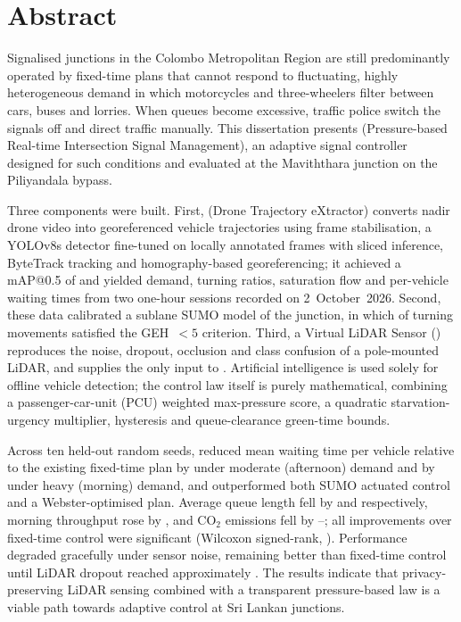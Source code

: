 \chapter*{Abstract}
\thispagestyle{plain}

Signalised junctions in the Colombo Metropolitan Region are still predominantly operated by fixed-time plans that cannot respond to fluctuating, highly heterogeneous demand in which motorcycles and three-wheelers filter between cars, buses and lorries. When queues become excessive, traffic police switch the signals off and direct traffic manually. This dissertation presents \prism{} (Pressure-based Real-time Intersection Signal Management), an adaptive signal controller designed for such conditions and evaluated at the Maviththara junction on the Piliyandala bypass.

Three components were built. First, \dtx{} (Drone Trajectory eXtractor) converts nadir drone video into georeferenced vehicle trajectories using frame stabilisation, a YOLOv8s detector fine-tuned on locally annotated frames with sliced inference, ByteTrack tracking and homography-based georeferencing; it achieved a mAP@0.5 of  and yielded demand, turning ratios, saturation flow and per-vehicle waiting times from two one-hour sessions recorded on 2~October~2026. Second, these data calibrated a sublane SUMO model of the junction, in which  of turning movements satisfied the GEH~$<5$ criterion. Third, a Virtual LiDAR Sensor (\vls{}) reproduces the noise, dropout, occlusion and class confusion of a pole-mounted LiDAR, and supplies the only input to \prism{}. Artificial intelligence is used solely for offline vehicle detection; the control law itself is purely mathematical, combining a passenger-car-unit (PCU) weighted max-pressure score, a quadratic starvation-urgency multiplier, hysteresis and queue-clearance green-time bounds.

Across ten held-out random seeds, \prism{} reduced mean waiting time per vehicle relative to the existing fixed-time plan by  under moderate (afternoon) demand and by  under heavy (morning) demand, and outperformed both SUMO actuated control and a Webster-optimised plan. Average queue length fell by  and  respectively, morning throughput rose by , and CO$_2$ emissions fell by --; all improvements over fixed-time control were significant (Wilcoxon signed-rank, ). Performance degraded gracefully under sensor noise, remaining better than fixed-time control until LiDAR dropout reached approximately . The results indicate that privacy-preserving LiDAR sensing combined with a transparent pressure-based law is a viable path towards adaptive control at Sri Lankan junctions.

